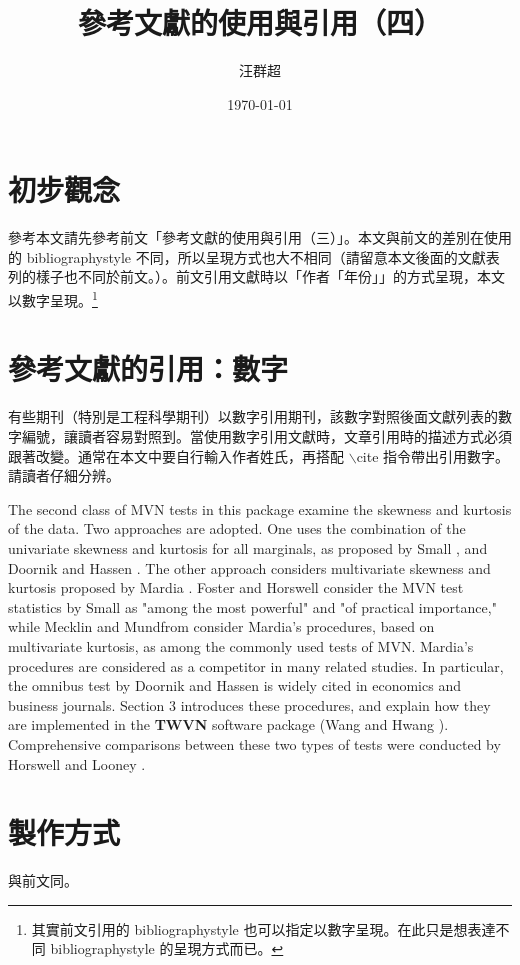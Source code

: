 \documentclass[12pt, a4paper]{article}
\title{ {\MB 參考文獻的使用與引用（四）}}		%
\author{{\SM 汪群超}}						%
\date{{\TT \today }}
\begin{document}
\maketitle
\fontsize{12}{22pt}\selectfont %
\section{初步觀念}
參考本文請先參考前文「參考文獻的使用與引用（三）」。本文與前文的差別在使用的 bibliographystyle 不同，所以呈現方式也大不相同（請留意本文後面的文獻表列的樣子也不同於前文。）。前文引用文獻時以「作者「年份」」的方式呈現，本文以數字呈現。\footnote{其實前文引用的 bibliographystyle 也可以指定以數字呈現。在此只是想表達不同 bibliographystyle 的呈現方式而已。}

\section{參考文獻的引用：數字} 
有些期刊（特別是工程科學期刊）以數字引用期刊，該數字對照後面文獻列表的數字編號，讓讀者容易對照到。當使用數字引用文獻時，文章引用時的描述方式必須跟著改變。通常在本文中要自行輸入作者姓氏，再搭配 $\backslash$cite 指令帶出引用數字。請讀者仔細分辨。

{\T The second class of MVN tests in this package examine the skewness and kurtosis of the data. Two approaches are adopted. One uses the combination of the univariate skewness and kurtosis for all marginals, as proposed by Small \cite{SMALL:1980}, and Doornik and Hassen \cite{DOORNIK:2008}. The other approach considers multivariate skewness and kurtosis proposed by Mardia \cite{MARDIA:1970}.   Foster \cite{FOSTER:1981} and Horswell \cite{HORSWELL:1990} consider the MVN test statistics by Small as "among the most powerful" and "of practical importance,"  while  Mecklin and Mundfrom \cite{MM} consider Mardia's procedures, based on multivariate kurtosis, as among the commonly used tests of MVN.  Mardia's procedures are considered as a competitor  in many related studies.
In particular, the omnibus test by  Doornik and Hassen \cite{DOORNIK:2008} is widely cited in economics and business journals. Section 3 introduces these procedures, and explain how they are implemented in the \textbf{TWVN} software package (Wang and Hwang \cite{WH}). Comprehensive  comparisons between these two types of tests were conducted by Horswell and Looney \cite{HORSWELL:1992}.}

\section{製作方式}
與前文同。

%
%
%
%
%
%



\end{document}
